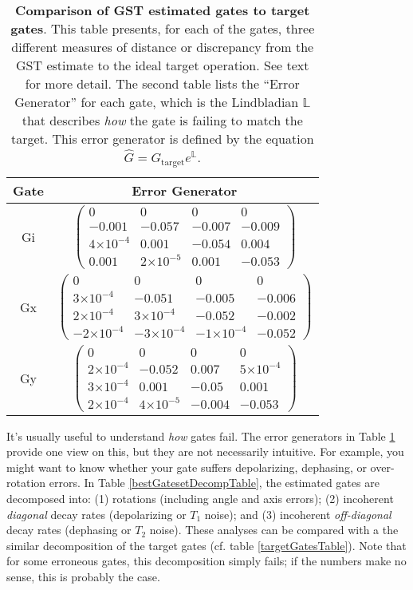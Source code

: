 \documentclass{article}[11pt]
\providecommand{\e}[1]{\ensuremath{\times 10^{#1}}}
\begin{document}
\begin{table}[h]
\begin{center}
\vspace{2em}
\begin{tabular}[l]{|c|c|}
\hline
Gate & Error Generator \\ \hline
Gi & $ \left(\!\!\begin{array}{cccc}
0 & 0 & 0 & 0 \\ 
-0.001 & -0.057 & -0.007 & -0.009 \\ 
4\e{-4} & 0.001 & -0.054 & 0.004 \\ 
0.001 & 2\e{-5} & 0.001 & -0.053
 \end{array}\!\!\right) $
 \\ \hline
Gx & $ \left(\!\!\begin{array}{cccc}
0 & 0 & 0 & 0 \\ 
3\e{-4} & -0.051 & -0.005 & -0.006 \\ 
2\e{-4} & 3\e{-4} & -0.052 & -0.002 \\ 
-2\e{-4} & -3\e{-4} & -1\e{-4} & -0.052
 \end{array}\!\!\right) $
 \\ \hline
Gy & $ \left(\!\!\begin{array}{cccc}
0 & 0 & 0 & 0 \\ 
2\e{-4} & -0.052 & 0.007 & 5\e{-4} \\ 
3\e{-4} & 0.001 & -0.05 & 0.001 \\ 
2\e{-4} & 4\e{-5} & -0.004 & -0.053
 \end{array}\!\!\right) $
 \\ \hline
\end{tabular}

\caption{\textbf{Comparison of GST estimated gates to target gates}.  This table presents, for each of the gates, three different measures of distance or discrepancy from the GST estimate to the ideal target operation.  See text for more detail.  The second table lists the ``Error Generator'' for each gate, which is the Lindbladian $\mathbb{L}$ that describes \emph{how} the gate is failing to match the target.  This error generator is defined by the equation $\hat{G} = G_{\mathrm{target}}e^{\mathbb{L}}$. \label{bestGatesetVsTargetTable}}
\end{center}
\end{table}

It's usually useful to understand \emph{how} gates fail.  The error generators in Table \ref{bestGatesetVsTargetTable} provide one view on this, but they are not necessarily intuitive.   For example, you might want to know whether your gate suffers depolarizing, dephasing, or over-rotation errors.  In Table \ref{bestGatesetDecompTable}, the estimated gates are decomposed into: (1) rotations (including angle and axis errors); (2) incoherent \emph{diagonal} decay rates (depolarizing or $T_1$ noise); and (3) incoherent \emph{off-diagonal} decay rates (dephasing or $T_2$ noise).  These analyses can be compared with a the similar decomposition of the target gates (cf. table \ref{targetGatesTable}).  Note that for some erroneous gates, this decomposition simply fails; if the numbers make no sense, this is probably the case.
\end{document}
